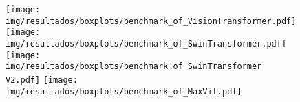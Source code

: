 \begin{figure}[h!]
	\texttt{[image: img/resultados/boxplots/benchmark\_of\_VisionTransformer.pdf]}
	\texttt{[image: img/resultados/boxplots/benchmark\_of\_SwinTransformer.pdf]}
	\texttt{[image: img/resultados/boxplots/benchmark\_of\_SwinTransformer V2.pdf]}
	\texttt{[image: img/resultados/boxplots/benchmark\_of\_MaxVit.pdf]}
	\caption{}
	\label{fig:Time_of_Transformers}
\end{figure}
